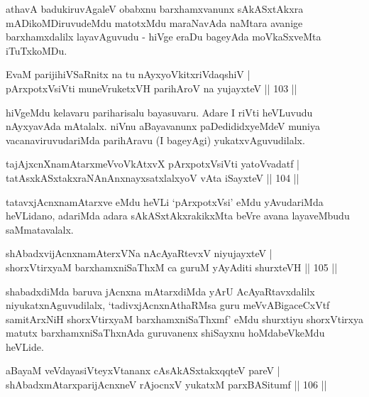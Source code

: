 \begin{artha}
athavA badukiruvAgaleV obabxnu barxhamxvanunx sAkASxtAkxra mADikoMDiruvudeMdu matotxMdu maraNavAda naMtara avanige barxhamxdalilx layavAguvudu - hiVge eraDu bageyAda moVkaSxveMta iTuTxkoMDu.
\end{artha}

\begin{shl}
EvaM parijihiVSaRnitx na tu nAyxyoVkitxriVdaqshiV |\\
pArxpotxV\s siVti muneVruketxVH parihAroV na yujayxteV \hfill || 103 || 
\end{shl}

\begin{artha}
hiVgeMdu kelavaru pariharisalu bayasuvaru. Adare I riVti heVLuvudu nAyxyavAda mAtalalx. niVnu aBayavanunx paDedididxyeMdeV muniya vacanaviruvudariMda parihAravu (I bageyAgi) yukatxvAguvudilalx.
\end{artha}


\begin{shl}
tajAjxcnXnamAtarxmeVvoVkAtxvX pArxpotxV\s siVti yatoV\s vadatf |\\
tatAsxkASxtakxraNAnAnxnayxsatxlalxyoV vA\s ta iSayxteV \hfill || 104 || 
\end{shl}

\begin{artha}
tatavxjAcnxnamAtarxve eMdu heVLi `pArxpotxVsi' eMdu yAvudariMda heVLidano, adariMda adara sAkASxtAkxrakikxMta beVre avana layaveMbudu saMmatavalalx.
\end{artha}

\begin{shl}
shAbadxvijAcnxnamAterxVNa nA\s \s cAyaRtevxV niyujayxteV |\\
shorxVtirxyaM barxhamxniSaThxM ca guruM yAyAditi shurxteVH \hfill || 105 || 
\end{shl}

\begin{artha}
shabadxdiMda baruva jAcnxna mAtarxdiMda yArU AcAyaRtavxdalilx niyukatxnAguvudilalx, `tadivxjAcnxnAthaRMsa guru meVvABigaceCxVtf samitArxNiH shorxVtirxyaM barxhamxniSaThxmf' eMdu shurxtiyu shorxVtirxya matutx barxhamxniSaThxnAda guruvanenx shiSayxnu hoMdabeVkeMdu heVLide.
\end{artha}

\begin{shl}
aBayaM veVdayasiVteyxVtananx cAsAkASxtakxqqteV pareV |\\
shAbadxmAtarxparijAcnxneV rAjocnxV yukatxM parxBASitumf \hfill || 106 || 
\end{shl}

